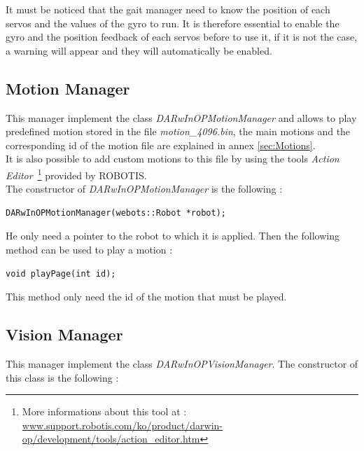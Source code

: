 \documentclass[a4paper, 12pt]{article}  		%
\begin{document}
It must be noticed that the gait manager need to know the position of each servos and the values of the gyro to run. It is therefore essential to enable the gyro and the position feedback of each servos before to use it, if it is not the case, a warning will appear and they will automatically be enabled.\\

\subsection{Motion Manager}
This manager implement the class \textit{DARwInOPMotionManager} and allows to play predefined motion stored in the file \textit{motion\_4096.bin}, the main motions and the corresponding id of the motion file are explained in annex \ref{sec:Motions}.\\

It is also possible to add custom motions to this file by using the tools \textit{Action Editor} \,\footnote{ More informations about this tool at : \url{www.support.robotis.com/ko/product/darwin-op/development/tools/action_editor.htm}} provided by ROBOTIS.\\

The constructor of \textit{DARwInOPMotionManager} is the following :\\
\lstset{language=c++} 
\lstset{commentstyle=\textit} 
\begin{lstlisting} 
DARwInOPMotionManager(webots::Robot *robot);
\end{lstlisting}

He only need a pointer to the robot to which it is applied. Then the following method can be used to play a motion :\\

\lstset{language=c++} 
\lstset{commentstyle=\textit} 
\begin{lstlisting} 
void playPage(int id);
\end{lstlisting}

This method only need the id of the motion that must be played.\\

\newpage
\subsection{Vision Manager}
This manager implement the class \textit{DARwInOPVisionManager}. The constructor of this class is the following :\\
\end{document}
